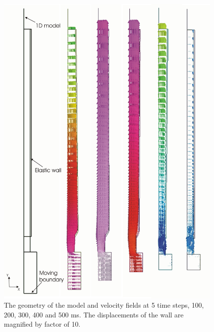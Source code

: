 \begin{figure}[!hb]
\begin{center}
\includegraphics[width=\textwidth]{kollaasi}
\caption{The geometry of the model and velocity fields at 5 time steps, 
100, 200, 300, 400 and 500 ms.  The displacements of the wall are 
magnified by factor of 10.}
\label{fig:velofields}
\end{center}
\end{figure}

